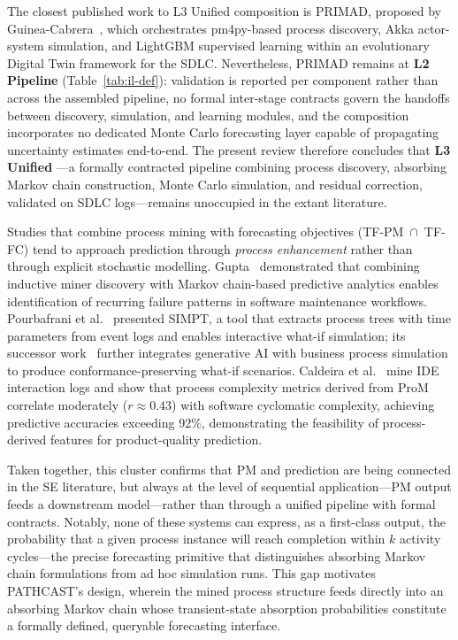 The closest published work to L3 Unified composition is
PRIMAD, proposed by Guinea-Cabrera~\cite{guinea2025}, which orchestrates
pm4py-based process discovery, Akka actor-system simulation, and LightGBM
supervised learning within an evolutionary Digital Twin framework for the SDLC.
Nevertheless, PRIMAD remains at \textbf{L2 Pipeline}
(Table~\ref{tab:il-def}):
validation is reported per component rather than across the assembled pipeline,
no formal inter-stage contracts govern the handoffs between discovery,
simulation, and learning modules, and the composition incorporates no dedicated
Monte Carlo forecasting layer capable of propagating uncertainty estimates
end-to-end. The present review therefore concludes that \textbf{L3 Unified}
---a formally contracted pipeline combining process discovery,
absorbing Markov chain construction, Monte Carlo simulation, and residual
correction, validated on SDLC logs---remains unoccupied in the extant literature.

Studies that combine process mining with forecasting objectives (TF-PM~$\cap$~TF-FC)
tend to approach prediction through \emph{process enhancement} rather than
through explicit stochastic modelling. Gupta~\cite{gupta2017} demonstrated that
combining inductive miner discovery with Markov chain-based predictive analytics
enables identification of recurring failure patterns in software maintenance
workflows. Pourbafrani et al.~\cite{pourbafrani2021} presented SIMPT, a tool
that extracts process trees with time parameters from event logs and enables
interactive what-if simulation; its successor work~\cite{buliga2025} further
integrates generative AI with business process simulation to produce
conformance-preserving what-if scenarios. Caldeira et al.~\cite{caldeira2022}
mine IDE interaction logs and show that process complexity metrics derived from
ProM correlate moderately ($r \approx 0.43$) with software cyclomatic
complexity, achieving predictive accuracies exceeding 92\%, demonstrating the
feasibility of process-derived features for product-quality prediction.

Taken together, this cluster confirms that PM and prediction are being connected
in the SE literature, but always at the level of sequential application---PM
output feeds a downstream model---rather than through a unified pipeline with
formal contracts. Notably, none of these systems can express, as a first-class
output, the probability that a given process instance will reach completion
within $k$ activity cycles---the precise forecasting primitive that distinguishes
absorbing Markov chain formulations from ad hoc simulation runs. This gap
motivates PATHCAST's design, wherein the mined process structure feeds directly
into an absorbing Markov chain whose transient-state absorption probabilities
constitute a formally defined, queryable forecasting interface.


